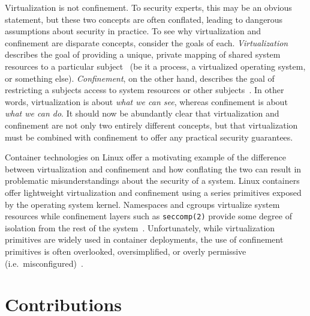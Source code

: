 Virtualization is not confinement. To security experts, this may be an obvious statement,
but these two concepts are often conflated, leading to dangerous assumptions about
security in practice. To see why virtualization and confinement are disparate concepts,
consider the goals of each. \textit{Virtualization} describes the goal of providing
a unique, private mapping of shared system resources to a particular subject~
(be it a process, a virtualized operating system, or something else).
\textit{Confinement}, on the other hand, describes the goal of restricting a subjects
access to system resources or other subjects~. In other words, virtualization
is about \textit{what we can see}, whereas confinement is about \textit{what we can do}.
It should now be abundantly clear that virtualization and confinement are not only two
entirely different concepts, but that virtualization must be combined with confinement to
offer any practical security guarantees.

\begin{inprogress}
  Container technologies on Linux offer a motivating example of the difference between
  virtualization and confinement and how conflating the two can result in problematic
  misunderstandings about the security of a system. Linux containers offer lightweight
  virtualization and confinement using a series primitives exposed by the operating system
  kernel. Namespaces and cgroups virtualize system resources while confinement layers such
  as \texttt{seccomp(2)} provide some degree of isolation from the rest of the system~.
  Unfortunately, while virtualization primitives are widely used in container deployments,
  the use of confinement primitives is often overlooked, oversimplified, or overly
  permissive (i.e.~misconfigured)~.
\end{inprogress}


\section{Contributions}%
\label{s:contributions}
